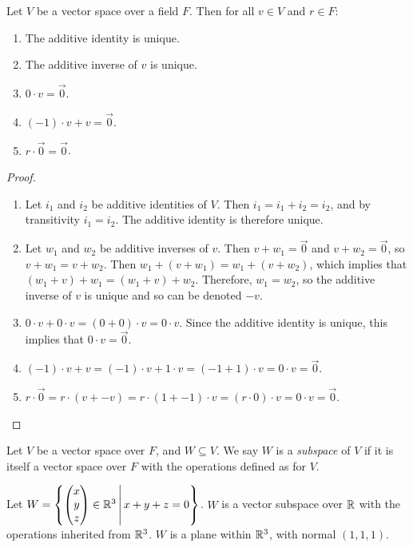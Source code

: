 \begin{lemma}\label{vector-space-properties}
    Let $V$ be a vector space over a field $F$. Then for all $v \in V$ and $r \in F$: \begin{enumerate}
        \item The additive identity is unique.
        \item The additive inverse of $v$ is unique.
        \item $0 \cdot v = \vec{0}$.
        \item $(-1) \cdot v + v = \vec{0}$.
        \item $r \cdot \vec{0} = \vec{0}$.
    \end{enumerate}
\end{lemma}

\begin{proof}\proofbreak
    \begin{enumerate}
        \item Let $i_1$ and $i_2$ be additive identities of $V$. Then $i_1 = i_1 + i_2 = i_2$, and by transitivity $i_1 = i_2$. The additive identity is therefore unique.
        \item Let $w_1$ and $w_2$ be additive inverses of $v$. Then $v + w_1 = \vec{0}$ and $v + w_2 = \vec{0}$, so $v + w_1 = v + w_2$. Then $w_1 + (v + w_1) = w_1 + (v + w_2)$, which implies that $(w_1 + v) + w_1 = (w_1 + v) + w_2$. Therefore, $w_1 = w_2$, so the additive inverse of $v$ is unique and so can be denoted $-v$.
        \item $0 \cdot v + 0 \cdot v = (0 + 0) \cdot v = 0 \cdot v$. Since the additive identity is unique, this implies that $0 \cdot v = \vec{0}$.
        \item $(-1) \cdot v + v = (-1) \cdot v + 1 \cdot v = (-1 + 1) \cdot v = 0 \cdot v = \vec{0}$.
        \item $r \cdot \vec{0} = r \cdot (v + -v) = r \cdot (1 + -1) \cdot v = (r \cdot 0)\cdot v = 0 \cdot v = \vec{0}$.
    \end{enumerate}
\end{proof}

\begin{defn}\label{subspace-defn}
    Let $V$ be a vector space over $F$, and $W \subseteq V$. We say $W$ is a \emph{subspace} of $V$ if it is itself a vector space over $F$ with the operations defined as for $V$.
\end{defn}

\begin{exmp}
    Let $W = \left\{\begin{pmatrix}
            x \\ y \\ z
        \end{pmatrix} \in \mathbb{R}^3 \,\middle|\, x + y + z = 0\right\}$. $W$ is a vector subspace over $\mathbb{R}$ with the operations inherited from $\mathbb{R}^3$. $W$ is a plane within $\mathbb{R}^3$, with normal $(1, 1, 1)$.
\end{exmp}

